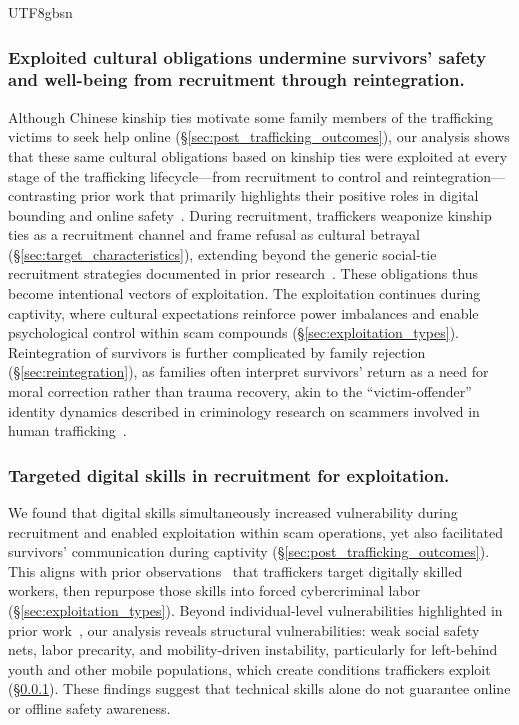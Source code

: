 \documentclass[sigconf,nonacm]{acmart}
\newcommand{\add}[1]{#1}
\begin{document}
\begin{CJK}{UTF8}{gbsn}
\subsubsection{Exploited cultural obligations undermine survivors' safety and well-being from recruitment through reintegration.}
\label{subsec:disc_cultural_obligations}

Although Chinese kinship ties motivate some family members of the trafficking victims to seek help online (\S\ref{sec:post_trafficking_outcomes}), our analysis shows that these same cultural obligations based on kinship ties were exploited at every stage of the trafficking lifecycle---from recruitment to control and reintegration---contrasting prior work that primarily highlights their positive roles in digital bounding and online safety~\cite{lei2025ai, deng-deng25}. During recruitment, traffickers weaponize kinship ties as a recruitment channel and frame refusal as cultural betrayal (\S\ref{sec:target_characteristics}), extending beyond the generic social-tie recruitment strategies documented in prior research~\cite{lazarus2025assessing, luong2025simple}. These obligations thus become intentional vectors of exploitation. The exploitation continues during captivity, where cultural expectations reinforce power imbalances and enable psychological control within scam compounds (\S\ref{sec:exploitation_types}). Reintegration of survivors is further complicated by family rejection (\S\ref{sec:reintegration}), as families often interpret survivors' return as a need for moral correction rather than trauma recovery, akin to the ``victim-offender'' identity dynamics described in criminology research on scammers involved in human trafficking~\cite{Wang2024}.

\add{\subsubsection{Targeted digital skills in recruitment for exploitation.}
We found that digital skills simultaneously increased vulnerability during recruitment and enabled exploitation within scam operations, yet also facilitated survivors' communication during captivity (\S\ref{sec:post_trafficking_outcomes}). This aligns with prior observations~\cite{luong2025simple, jesperson2023trafficking} that traffickers target digitally skilled workers, then repurpose those skills into forced cybercriminal labor~\cite{henderson2023got, hrc2022cyberslaver} (\S\ref{sec:exploitation_types}). Beyond individual-level vulnerabilities highlighted in prior work~\cite{luong2024understanding, lazarus2025assessing, luong2025simple}, our analysis reveals structural vulnerabilities: weak social safety nets, labor precarity, and mobility-driven instability, particularly for left-behind youth and other mobile populations, which create conditions traffickers exploit (\S\ref{subsec:disc_cultural_obligations}). These findings suggest that technical skills alone do not guarantee online or offline safety awareness.}


\end{CJK}
\end{document}
